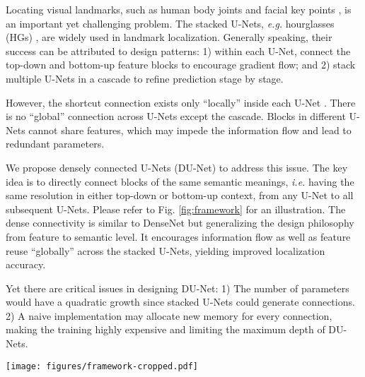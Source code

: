 \documentclass[runningheads]{llncs}
\begin{document}
Locating visual landmarks, such as human body joints \cite{toshev2014deeppose} and facial key points \cite{xiong2013supervised}, is an important yet challenging problem. The stacked U-Nets, {\it e.g.} hourglasses (HGs) \cite{newell2016stacked}, are widely used in landmark localization. Generally speaking, their success can be attributed to design patterns: 1) within each U-Net, connect the top-down and bottom-up feature blocks to encourage gradient flow; and 2) stack multiple U-Nets in a cascade to refine prediction stage by stage.

However, the shortcut connection exists only ``locally'' inside each U-Net \cite{ronneberger2015u}. There is no ``global'' connection across U-Nets except the cascade. Blocks in different U-Nets cannot share features, which may impede the information flow and lead to redundant parameters.

We propose densely connected U-Nets (DU-Net) to address this issue. The key idea is to directly connect blocks of the same semantic meanings, {\it i.e.} having the same resolution in either top-down or bottom-up context, from any U-Net to all subsequent U-Nets. Please refer to Fig. \ref{fig:framework} for an illustration. The dense connectivity is similar to DenseNet \cite{huang2016densely} but generalizing the design philosophy from feature to semantic level. It encourages information flow as well as feature reuse ``globally'' across the stacked U-Nets, yielding improved localization accuracy. 

Yet there are critical issues in designing DU-Net: 1) The number of parameters would have a quadratic growth since  stacked U-Nets could generate  connections. 2) A naive implementation may allocate new memory for every connection, making the training highly expensive and limiting the maximum depth of DU-Nets. 





\begin{figure*}[t!]
\centering
  \texttt{[image: figures/framework-cropped.pdf]}
\caption{Illustration of stacked U-Nets and DU-Net. Stacked U-Nets has skip connections only within each U-Net. In contrast, DU-Net also connects blocks with the same semantic meanings across different U-Nets. The feature reuse could significantly reduce the size of bottleneck in each block, as shown in the right figure. Consequently, with the same number of U-Nets, DU-Net has only 30\% parameters of stacked U-Nets.}
\label{fig:framework}
\end{figure*}
\end{document}
